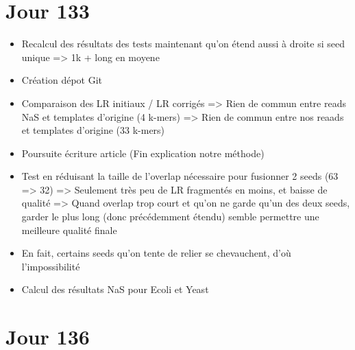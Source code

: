 \documentclass[12pt]{report}
\begin{document}
\section{Jour 133}

\begin{itemize}
	\item Recalcul des résultats des tests maintenant qu'on étend aussi à droite si seed unique => 1k + long en moyene
	
	\item Création dépot Git
	
	\item Comparaison des LR initiaux / LR corrigés => Rien de commun entre reads NaS et templates d'origine (4 k-mers)
												  => Rien de commun entre nos reaads et templates d'origine (33 k-mers)
	
	\item Poursuite écriture article (Fin explication notre méthode)
	
	\item Test en réduisant la taille de l'overlap nécessaire pour fusionner 2 seeds (63 => 32)
		  => Seulement très peu de LR fragmentés en moins, et baisse de qualité
		  => Quand overlap trop court et qu'on ne garde qu'un des deux seeds, garder le plus long (donc précédemment étendu)
		  semble permettre une meilleure qualité finale
	
	\item En fait, certains seeds qu'on tente de relier se chevauchent, d'où l'impossibilité
	
	\item Calcul des résultats NaS pour Ecoli et Yeast
\end{itemize}

\section{Jour 136}
\end{document}
